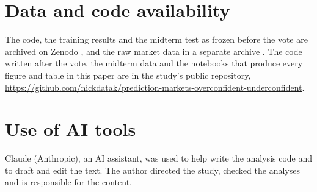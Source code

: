 \section*{Data and code availability}

The code, the training results and the midterm test as frozen before the vote are archived on Zenodo
\citep{kirillov2026code}, and the raw market data in a separate archive \citep{kirillov2026data}. The code written
after the vote, the midterm data and the notebooks that produce every figure and table in this paper are in the
study's public repository, \url{https://github.com/nickdatak/prediction-markets-overconfident-underconfident}.

\section*{Use of AI tools}

Claude (Anthropic), an AI assistant, was used to help write the analysis code and to draft and edit the text. The
author directed the study, checked the analyses and is responsible for the content.
